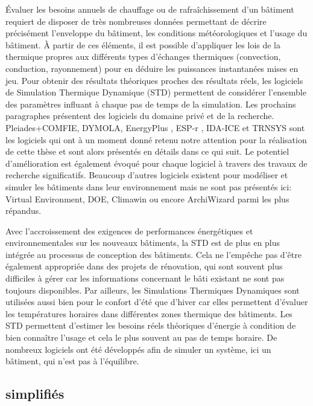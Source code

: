 Évaluer les besoins annuels de chauffage ou de rafraîchissement d'un bâtiment requiert de disposer de très nombreuses données permettant de décrire précisément l'enveloppe du bâtiment, les conditions météorologiques et l'usage du bâtiment. À partir de ces éléments, il est possible d'appliquer les lois de la thermique propres aux différents types d'échanges thermiques (convection, conduction, rayonnement) pour en déduire les puissances instantanées mises en jeu. Pour obtenir des résultats théoriques proches des résultats réels, les logiciels de Simulation Thermique Dynamique (STD) permettent de considérer l'ensemble des paramètres influant à chaque pas de temps de la simulation. Les prochains paragraphes présentent des logiciels du domaine privé et de la recherche. Pleiades+COMFIE, DYMOLA, EnergyPlus , ESP-r , IDA-ICE et TRNSYS sont les logiciels qui ont à un moment donné retenu notre attention pour la réalisation de cette thèse et sont alors présentés en détails dans ce qui suit. Le potentiel d'amélioration est également évoqué pour chaque logiciel à travers des travaux de recherche significatifs. Beaucoup d'autres logiciels existent pour modéliser et simuler les bâtiments dans leur environnement mais ne sont pas présentés ici: Virtual Environment, DOE, Climawin ou encore ArchiWizard parmi les plus répandus.

Avec l'accroissement des exigences de performances énergétiques et environnementales sur les nouveaux bâtiments, la STD est de plus en plus intégrée au processus de conception des bâtiments. Cela ne l'empêche pas d'être également appropriée dans des projets de rénovation, qui sont souvent plus difficiles à gérer car les informations concernant le bâti existant ne sont pas toujours disponibles. Par ailleurs, les Simulations Thermiques Dynamiques sont utilisées aussi bien pour le confort d'été que d'hiver car elles permettent d'évaluer les températures horaires dans différentes zones thermique des bâtiments. Les STD permettent d'estimer les besoins réels théoriques d'énergie à condition de bien connaître l'usage et cela le plus souvent au pas de temps horaire. De nombreux logiciels ont été développés afin de simuler un système, ici un bâtiment, qui n'est pas à l'équilibre.

\subsection*{simplifiés}

